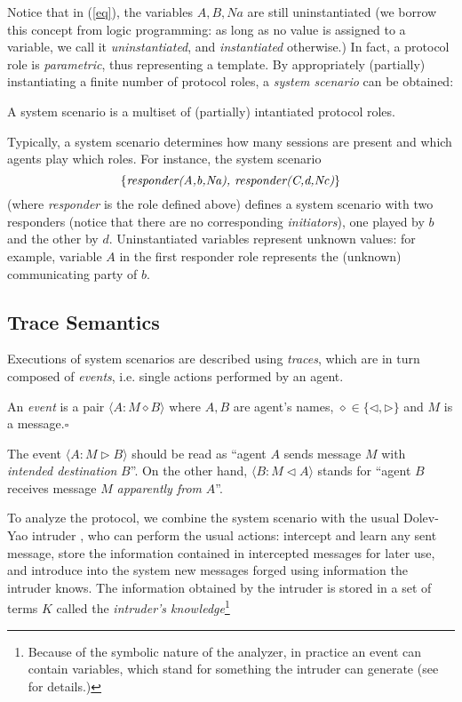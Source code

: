 \documentclass{entcs} \usepackage{entcsmacro}
\newcommand{\IO}{\ensuremath{\diamond}}
\newcommand{\IN}{\ensuremath{\triangleleft}}
\newcommand{\OUT}{\ensuremath{\triangleright}}
\newcommand{\HB}{\hfill{$\square$}}
\begin{document}
Notice that in (\ref{eq}), the variables $A,B,Na$ are still
uninstantiated (we borrow this concept from logic programming: as long
as no value is assigned to a variable, we call it
\emph{uninstantiated}, and \emph{instantiated} otherwise.) In fact, a
protocol role is \emph{parametric}, thus representing a template.  By
appropriately (partially) instantiating a finite number of protocol
roles, a \emph{system scenario} can be obtained:
\begin{definition}
A system scenario is a multiset of (partially) intantiated protocol roles.
\end{definition}

Typically, a system scenario determines how many sessions are present
and which agents play which roles. For instance, the system scenario
$$\{ \emph{responder(A,b,Na), responder(C,d,Nc)} \} $$ (where
\emph{responder} is the role defined above) defines a system scenario
with two responders (notice that there are no corresponding
\emph{initiators}), one played by $b$ and the other by
$d$. Uninstantiated variables represent unknown values: for example,
variable $A$ in the first responder role represents the (unknown)
communicating party of $b$.

\subsection{Trace Semantics}

Executions of system scenarios are described using \emph{traces}, which 
are in turn composed of \emph{events}, i.e. single actions performed 
by an agent.

\begin{definition} An \emph{event} is a pair $\langle A : M \IO  B \rangle$
  where $A,B$ are agent's names, $\IO \in \{ \IN, \OUT \}$ and $M$ is
  a message.\HB
\end{definition}
The event $\langle A : M \triangleright B \rangle$ should be read as
``agent $A$ sends message $M$ with \emph{intended destination} $B$''.
On the other hand, $\langle B : M \triangleleft A \rangle$ stands for
``agent $B$ receives message $M$ \emph{apparently from} $A$''.

To analyze the protocol, we combine the system scenario with the usual
Dolev-Yao intruder \cite{DY83}, who can perform the usual actions: 
intercept and learn any sent message, store the information
contained in intercepted messages for later use, and introduce into
the system new messages forged using information the intruder knows. The
information obtained by the intruder is stored in a set of terms $K$
called the \emph{intruder's knowledge}\footnote{Because of the symbolic nature of the analyzer, in practice an event can contain variables, which stand for something the intruder can generate (see \cite{CE02} for details.)
}
\end{document}
